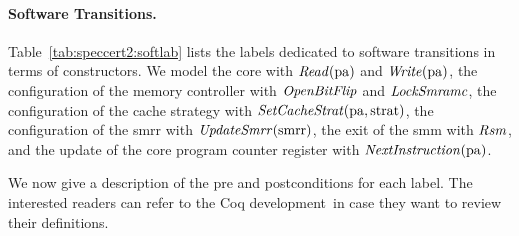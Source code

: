 \paragraph{Software Transitions.}
%
Table~\ref{tab:speccert2:softlab} lists the labels dedicated to software
transitions in terms of constructors.
%
We model the core \IOs with \( \mathit{Read}(\mathrm{pa}) \) and
\( \mathit{Write}(\mathrm{pa}) \), the configuration of the memory controller with
\( \mathit{OpenBitFlip} \) and \( \mathit{LockSmramc} \), the configuration of the
cache strategy with \( \mathit{SetCacheStrat}(\mathrm{pa}, \mathrm{strat}) \), the
configuration of the \ac{smrr} with \( \mathit{UpdateSmrr}(\mathrm{smrr}) \), the
exit of the \ac{smm} with $\mathit{Rsm}$, and the update of the core program
counter register with $\mathit{NextInstruction}(\mathrm{pa})$.


We now give a description of the pre and postconditions for each label.
%
The interested readers can refer to the Coq
development\,\cite{letan2016speccertcode} in case they want to review their
definitions.
%

